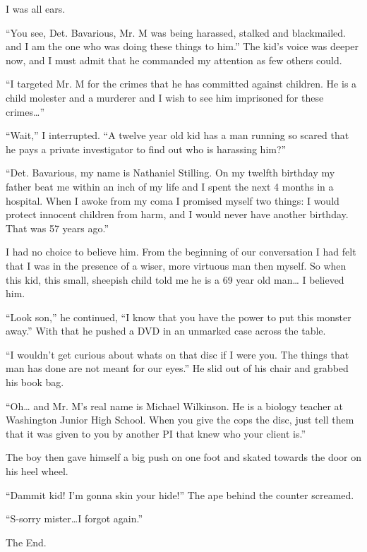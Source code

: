 I was all ears.



``You see, Det. Bavarious, Mr. M was being harassed, stalked and
blackmailed. and I am the one who was doing these things to him.''
The kid's voice was deeper now, and I must admit that he commanded
my attention as few others could.



``I targeted Mr. M for the crimes that he has committed against
children. He is a child molester and a murderer and I wish to see
him imprisoned for these crimes{\ldots}''



``Wait,'' I interrupted. ``A twelve year old kid has a man running so
scared that he pays a private investigator to find out who is
harassing him?''



``Det. Bavarious, my name is Nathaniel Stilling. On my twelfth
birthday my father beat me within an inch of my life and I spent
the next 4 months in a hospital. When I awoke from my coma I
promised myself two things: I would protect innocent children from
harm, and I would never have another birthday. That was 57 years
ago.''



I had no choice to believe him. From the beginning of our
conversation I had felt that I was in the presence of a wiser, more
virtuous man then myself. So when this kid, this small, sheepish
child told me he is a 69 year old man{\ldots} I believed him.



``Look son,'' he continued, ``I know that you have the power to put
this monster away.'' With that he pushed a DVD in an unmarked case
across the table.



``I wouldn't get curious about whats on that disc if I were you. The
things that man has done are not meant for our eyes.'' He slid out
of his chair and grabbed his book bag.



``Oh{\ldots} and Mr. M's real name is Michael Wilkinson. He is a biology
teacher at Washington Junior High School. When you give the cops
the disc, just tell them that it was given to you by another PI
that knew who your client is.''



The boy then gave himself a big push on one foot and skated towards
the door on his heel wheel.



``Dammit kid! I'm gonna skin your hide!'' The ape behind the counter
screamed.



``S-sorry mister{\ldots}I forgot again.''



The End. 
 





